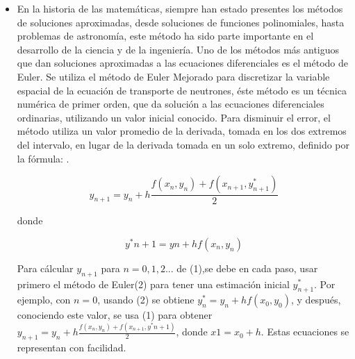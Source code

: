 \documentclass[12 pt,letterpaper]{article}
\begin{document}
	\begin{itemize}
		\item\justify 
		En la historia de las matemáticas, siempre han estado presentes los métodos de soluciones aproximadas, desde soluciones de funciones polinomiales, hasta problemas de astronomía, este método  ha sido parte importante en el desarrollo de la ciencia y de la ingeniería. Uno de los métodos más antiguos que dan soluciones aproximadas a las ecuaciones diferenciales es el método de Euler.
		Se utiliza el método de Euler Mejorado para discretizar la variable espacial de la ecuación de transporte de neutrones, éste método es un técnica numérica de primer orden, que da solución a las ecuaciones diferenciales ordinarias, utilizando un valor inicial conocido. Para disminuir el error, el método utiliza un valor promedio de la derivada, tomada en los dos extremos del intervalo, en lugar de la derivada tomada en un solo extremo, definido por la fórmula:
		.
		
		
		\begin{equation}
			y_{n+1}=y_{n}+h\frac{f(x_{n},y_{n})+f(x_{n+1},y^*_{n+1})}{2}
		\end{equation}
		
		donde
		
		
		\begin{equation}
			y^*{n+1}=y{n}+hf(x_{n},y_{n})
		\end{equation}\vspace{0.3Cm}
		
		Para cálcular $y_{n+1}$ para $n=0,1,2...$ de (1),se debe en cada paso, usar primero el método de Euler(2) para tener una estimación inicial $y^*_{n+1}$. Por ejemplo, con $n=0$, usando (2) se obtiene  $y^*_{n}= y_{n}+hf(x_{0},y_{0})$, y después, conociendo este valor, se usa (1) para obtener  $y_{n+1}=y_{n}+h\frac{f(x_{n},y_{n})+f(x_{n+1},y^*{n+1})}{2}$, donde $x{1}=x_{0}+h$. Estas ecuaciones se representan con facilidad.
		


\end{itemize}
\end{document}
